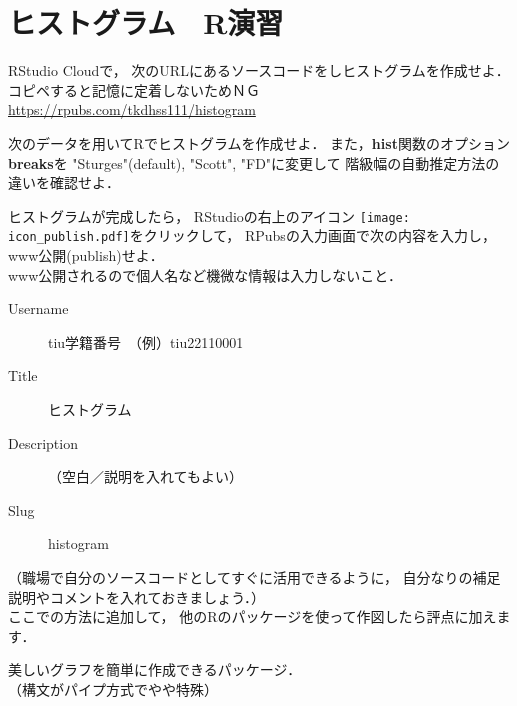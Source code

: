 \MyFrame{\insertsection}
{
  \MySolution
  {
  }
}

\section{ヒストグラム　R演習}

\MyFrame{\insertsection}
{
  RStudio Cloudで，
  次のURLにあるソースコードをしヒストグラムを作成せよ．
  \alert{コピペすると記憶に定着しないためＮＧ}
  \url{https://rpubs.com/tkdhss111/histogram}
}

\MyFrame{}
{

}

{
}

\MyFrame{}
{

}

\MyFrame{}
{

}

{
  次のデータを用いてRでヒストグラムを作成せよ．
  また，\textbf{hist}関数のオプション\textbf{breaks}を
  "Sturges"(default), "Scott", "FD"に変更して
  階級幅の自動推定方法の違いを確認せよ．\\
}

{
  ヒストグラムが完成したら，
  RStudioの右上のアイコン
  \texttt{[image: icon\_publish.pdf]}をクリックして，
  RPubsの入力画面で次の内容を入力し，
  www公開(publish)せよ．\\
  \alert{www公開されるので個人名など機微な情報は入力しないこと．}
  \begin{description}
    \item[Username] tiu学籍番号　（例）tiu22110001\\
    \item[Title] ヒストグラム\\
    \item[Description] （空白／説明を入れてもよい）\\
    \item[Slug] histogram
  \end{description}
  （職場で自分のソースコードとしてすぐに活用できるように，
    自分なりの補足説明やコメントを入れておきましょう．）\\
    ここでの方法に追加して，
    他のRのパッケージを使って作図したら評点に加えます．
}

{
  美しいグラフを簡単に作成できるパッケージ．\\
  （構文がパイプ方式でやや特殊）
}


